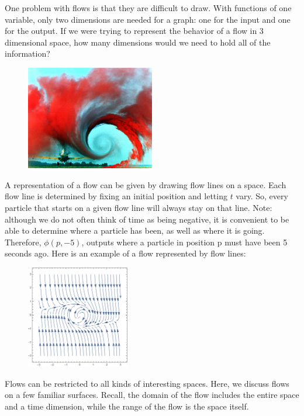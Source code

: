 One problem with flows is that they are difficult to draw. With functions of one variable, only two dimensions are needed for a graph: one for the input and one for the output. If we were trying to represent the behavior of a flow in 3 dimensional space, how many dimensions would we need to hold all of the information? \\
	\begin{figure}[H]
	   \centering
	   \includegraphics[width=0.5\textwidth]{season2/204/images/vortexflow.jpg} 
	\end{figure}
A representation of a flow can be given by drawing flow lines on a space. Each flow line is determined by fixing an initial position and letting $t$ vary. So, every particle that starts on a given flow line will always stay on that line. Note: although we do not often think of time as being negative, it is convenient to be able to determine where a particle has been, as well as where it is going. Therefore, $\phi(p,-5)$, outputs where a particle in position p must have been 5 seconds ago. Here is an example of a flow represented by flow lines:
	\begin{figure}[H]
	   \centering
	   \includegraphics[width=0.4\textwidth]{season2/204/images/flow.png} 
	\end{figure}
Flows can be restricted to all kinds of interesting spaces. Here, we discuss flows on a few familiar surfaces. Recall, the domain of the flow includes the entire space and a time dimension, while the range of the flow is the space itself. \\

